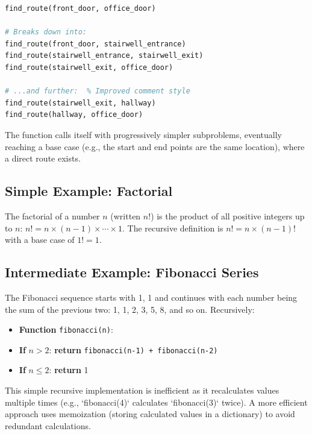 \documentclass[12pt, a4paper]{article}
\begin{document}
\begin{lstlisting}[language=Python, caption={Conceptual Example: Recursive Route Finding}, numbers=none]
find_route(front_door, office_door)

# Breaks down into:
find_route(front_door, stairwell_entrance)
find_route(stairwell_entrance, stairwell_exit)
find_route(stairwell_exit, office_door)

# ...and further:  % Improved comment style
find_route(stairwell_exit, hallway)
find_route(hallway, office_door) 
\end{lstlisting}

The function calls itself with progressively simpler subproblems, eventually reaching a base case (e.g., the start and end points are the same location), where a direct route exists.

\subsection{Simple Example: Factorial}

The factorial of a number $n$ (written $n!$) is the product of all positive integers up to $n$:  $n! = n \times (n-1) \times \cdots \times 1$.  The recursive definition is $n! = n \times (n-1)!$ with a base case of $1! = 1$.

 


\subsection{Intermediate Example: Fibonacci Series}

The Fibonacci sequence starts with 1, 1 and continues with each number being the sum of the previous two: 1, 1, 2, 3, 5, 8, and so on.  Recursively:

\begin{itemize}
    \item \textbf{Function} \texttt{fibonacci(n)}:
    \item \textbf{If} \(n > 2\): \textbf{return} \texttt{fibonacci(n-1) + fibonacci(n-2)}
    \item \textbf{If} \(n \le 2\): \textbf{return} 1 
\end{itemize}

This simple recursive implementation is inefficient as it recalculates values multiple times (e.g., `fibonacci(4)` calculates `fibonacci(3)` twice). A more efficient approach uses memoization (storing calculated values in a dictionary) to avoid redundant calculations.
\end{document}
